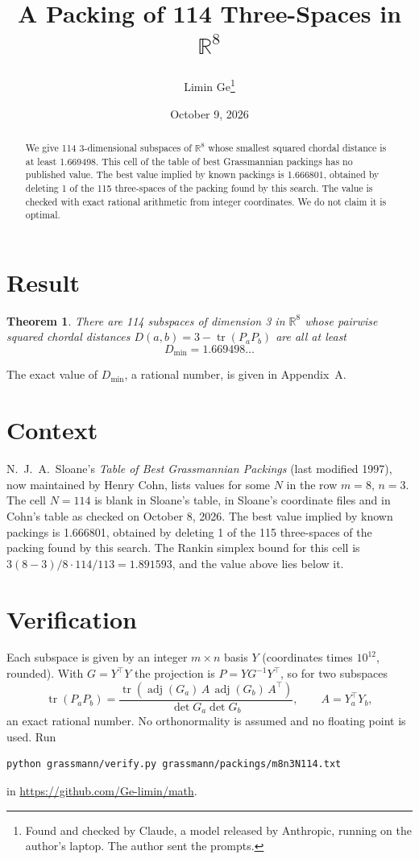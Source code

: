 \documentclass[11pt,a4paper]{article}
\title{A Packing of 114 Three-Spaces in $\mathbb{R}^{8}$}
\author{Limin Ge\thanks{Found and checked by Claude, a model released by Anthropic, running on the author's laptop. The author sent the prompts.}}
\date{October 9, 2026}
\newtheorem*{theorem}{Theorem}
\begin{document}
\maketitle
\begin{abstract}
We give 114 3-dimensional subspaces of $\mathbb{R}^{8}$ whose smallest squared chordal distance is at least 1.669498. This cell of the table of best Grassmannian packings has no published value. The best value implied by known packings is 1.666801, obtained by deleting 1 of the 115 three-spaces of the packing found by this search. The value is checked with exact rational arithmetic from integer coordinates. We do not claim it is optimal.
\end{abstract}

\section{Result}
\begin{theorem}
There are 114 subspaces of dimension 3 in $\mathbb{R}^{8}$ whose pairwise squared chordal distances $D(a,b) = 3 - \operatorname{tr}(P_aP_b)$ are all at least
\[ D_{\min} = 1.669498\ldots \]
\end{theorem}
The exact value of $D_{\min}$, a rational number, is given in Appendix~A.


\section{Context}
N.~J.~A.~Sloane's \emph{Table of Best Grassmannian Packings} (last modified 1997), now maintained by Henry Cohn, lists values for some $N$ in the row $m=8$, $n=3$. The cell $N=114$ is blank in Sloane's table, in Sloane's coordinate files and in Cohn's table as checked on October 8, 2026. The best value implied by known packings is 1.666801, obtained by deleting 1 of the 115 three-spaces of the packing found by this search. The Rankin simplex bound for this cell is $3(8-3)/8\cdot 114/113 = 1.891593$, and the value above lies below it.


\section{Verification}
Each subspace is given by an integer $m\times n$ basis $Y$ (coordinates times $10^{12}$, rounded). With $G=Y^\top Y$ the projection is $P=YG^{-1}Y^\top$, so for two subspaces
\[ \operatorname{tr}(P_aP_b)=\frac{\operatorname{tr}(\operatorname{adj}(G_a)\,A\,\operatorname{adj}(G_b)\,A^\top)}{\det G_a\det G_b},\qquad A=Y_a^\top Y_b, \]
an exact rational number. No orthonormality is assumed and no floating point is used. Run
\begin{verbatim}
python grassmann/verify.py grassmann/packings/m8n3N114.txt
\end{verbatim}
in \url{https://github.com/Ge-limin/math}.
\end{document}
